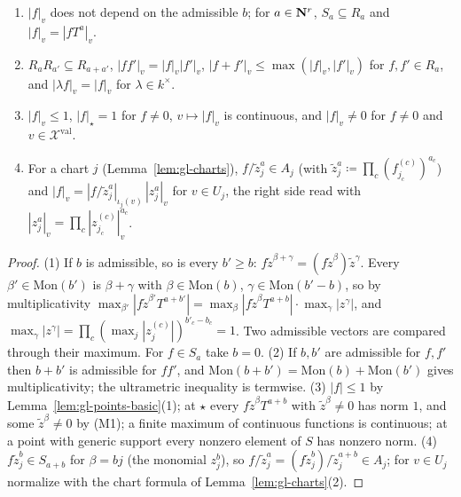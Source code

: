 \begin{lemma}\label{lem:gl-sections}
\leanok
{}
\begin{enumerate}
\item $|f|_v$ does not depend on the admissible $b$; for $a\in\mathbf{N}^r$, $S_a\subseteq R_a$ and $|f|_v=|fT^a|_v$.
\item $R_aR_{a'}\subseteq R_{a+a'}$, $|ff'|_v=|f|_v|f'|_v$, $|f+f'|_v\le\max(|f|_v,|f'|_v)$ for $f,f'\in R_a$, and $|\lambda f|_v=|f|_v$ for
$\lambda\in k^\times$.
\item $|f|_v\le1$, $|f|_\star=1$ for $f\ne0$, $v\mapsto|f|_v$ is continuous, and $|f|_v\ne0$ for $f\ne0$ and $v\in\mathcal X^{\mathrm{val}}$.
\item For a chart $j$ (Lemma~\ref{lem:gl-charts}), $f/\tilde z_j^a\in A_j$ (with $\tilde z_j^a\coloneqq\prod_c(f^{(c)}_{j_c})^{a_c}$) and
$|f|_v=|f/\tilde z_j^a|_{\iota_j(v)}\,|z_j^a|_v$ for $v\in U_j$, the right side read with $|z_j^a|_v=\prod_c|z^{(c)}_{j_c}|_v^{a_c}$.
\end{enumerate}
\end{lemma}

\begin{proof}
(1) If $b$ is admissible, so is every $b'\ge b$: $f\tilde z^{\beta+\gamma}=(f\tilde z^\beta)\tilde z^\gamma$. Every $\beta'\in\mathrm{Mon}(b')$ is $\beta+\gamma$
with $\beta\in\mathrm{Mon}(b)$, $\gamma\in\mathrm{Mon}(b'-b)$, so by multiplicativity
$\max_{\beta'}|f\tilde z^{\beta'}T^{a+b'}|=\max_\beta|f\tilde z^\beta T^{a+b}|\cdot\max_\gamma|z^\gamma|$, and $\max_\gamma|z^\gamma|=\prod_c(\max_j|z^{(c)}_j|)^{b'_c-b_c}=1$.
Two admissible vectors are compared through their maximum. For $f\in S_a$ take $b=0$. (2) If $b,b'$ are admissible for $f,f'$ then
$b+b'$ is admissible for $ff'$, and $\mathrm{Mon}(b+b')=\mathrm{Mon}(b)+\mathrm{Mon}(b')$ gives multiplicativity; the ultrametric inequality is
termwise. (3) $|f|\le1$ by Lemma~\ref{lem:gl-points-basic}(1); at $\star$ every $f\tilde z^\beta T^{a+b}$ with $\tilde z^\beta\ne0$ has norm $1$, and some
$\tilde z^\beta\ne0$ by (M1); a finite maximum of continuous functions is continuous; at a point with generic support every nonzero
element of $S$ has nonzero norm. (4) $f\tilde z_j^b\in S_{a+b}$ for $\beta=bj$ (the monomial $z_j^b$), so $f/\tilde z_j^a=(f\tilde z_j^b)/\tilde z_j^{a+b}\in A_j$;
for $v\in U_j$ normalize with the chart formula of Lemma~\ref{lem:gl-charts}(2).
\end{proof}


